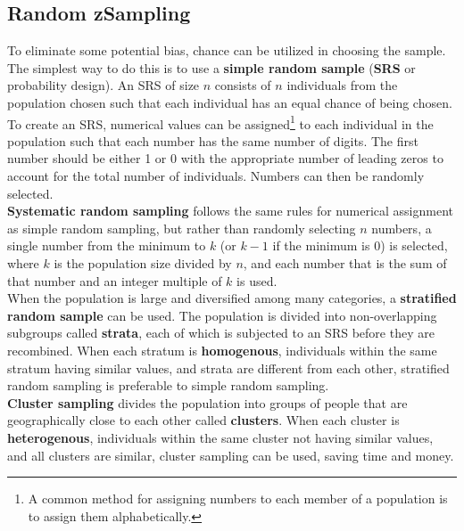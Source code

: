 \documentclass[../AP_Statistics.tex]{subfiles}
\begin{document}
		\subsection*{Random zSampling}
			To eliminate some potential bias, chance can be utilized in choosing the sample. The simplest way to do this is to use a \textbf{simple random sample} (\textbf{SRS} or probability design). An SRS of size $n$ consists of $n$ individuals from the population chosen such that each individual has an equal chance of being chosen. \\
			To create an SRS, numerical values can be assigned\footnote{A common method for assigning numbers to each member of a population is to assign them alphabetically.} to each individual in the population such that each number has the same number of digits. The first number should be either 1 or 0 with the appropriate number of leading zeros to account for the total number of individuals. Numbers can then be randomly selected. \\
			\textbf{Systematic random sampling} follows the same rules for numerical assignment as simple random sampling, but rather than randomly selecting $n$ numbers, a single number from the minimum to $k$ (or $k - 1$ if the minimum is 0) is selected, where $k$ is the population size divided by $n$, and each number that is the sum of that number and an integer multiple of $k$ is used. \\
			When the population is large and diversified among many categories, a \textbf{stratified random sample} can be used. The population is divided into non-overlapping subgroups called \textbf{strata}, each of which is subjected to an SRS before they are recombined. When each stratum is \textbf{homogenous}, individuals within the same stratum having similar values, and strata are different from each other, stratified random sampling is preferable to simple random sampling. \\
			\textbf{Cluster sampling} divides the population into groups of people that are geographically close to each other called \textbf{clusters}. When each cluster is \textbf{heterogenous}, individuals within the same cluster not having similar values, and all clusters are similar, cluster sampling can be used, saving time and money. \\
\end{document}
